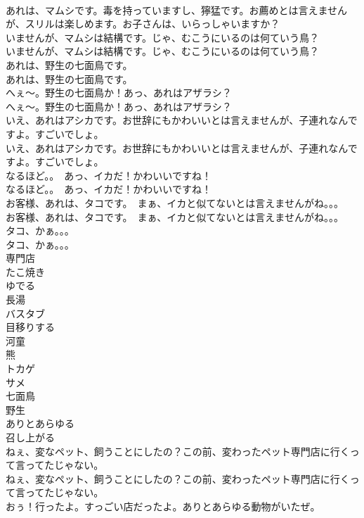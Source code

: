 \documentclass[8pt]{extreport}
\begin{document}
\begin{CJK}{UTF8}{min}
\\	あれは、マムシです。毒を持っていますし、獰猛です。お薦めとは言えませんが、スリルは楽しめます。お子さんは、いらっしゃいますか？ 
\\	いませんが、マムシは結構です。じゃ、むこうにいるのは何ていう鳥？	
\\	いませんが、マムシは結構です。じゃ、むこうにいるのは何ていう鳥？ 
\\	あれは、野生の七面鳥です。	
\\	あれは、野生の七面鳥です。 
\\	へぇ～。野生の七面鳥か！あっ、あれはアザラシ？	
\\	へぇ～。野生の七面鳥か！あっ、あれはアザラシ？ 
\\	いえ、あれはアシカです。お世辞にもかわいいとは言えませんが、子連れなんですよ。すごいでしょ。	
\\	いえ、あれはアシカです。お世辞にもかわいいとは言えませんが、子連れなんですよ。すごいでしょ。 
\\	なるほど。。　あっ、イカだ！かわいいですね！	
\\	なるほど。。　あっ、イカだ！かわいいですね！ 
\\	お客様、あれは、タコです。　まぁ、イカと似てないとは言えませんがね。。。	
\\	お客様、あれは、タコです。　まぁ、イカと似てないとは言えませんがね。。。 
\\	タコ、かぁ。。。	
\\	タコ、かぁ。。。 
\\	専門店
\\	たこ焼き
\\	ゆでる
\\	長湯
\\	バスタブ
\\	目移りする
\\	河童
\\	熊
\\	トカゲ
\\	サメ
\\	七面鳥
\\	野生
\\	ありとあらゆる
\\	召し上がる
\\	ねぇ、変なペット、飼うことにしたの？この前、変わったペット専門店に行くって言ってたじゃない。	
\\	ねぇ、変なペット、飼うことにしたの？この前、変わったペット専門店に行くって言ってたじゃない。 
\\	おぅ！行ったよ。すっごい店だったよ。ありとあらゆる動物がいたぜ。	

\end{CJK}
\end{document}
